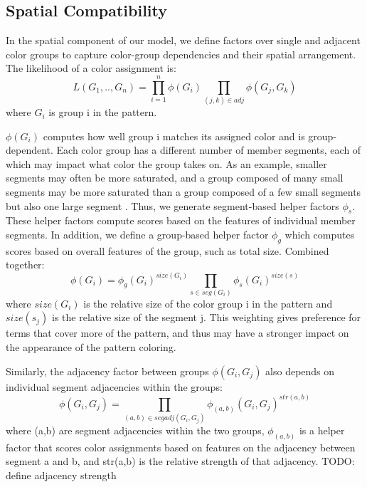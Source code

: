 \subsection{Spatial Compatibility}
\label{sec:spatialCompat}

In the spatial component of our model, we define factors over single and adjacent color groups to capture color-group dependencies and their spatial arrangement. The likelihood of a color assignment is:
\begin{equation}
L(G_1,..,G_n) = \prod_{i=1}^n \phi(G_i) \prod_{(j,k) \in adj} \phi(G_j, G_k)
\end{equation}
where $G_i$ is group i in the pattern.

$\phi(G_i)$ computes how well group i matches its assigned color and is group-dependent. Each color group has a different number of member segments, each of which may impact what color the group takes on. As an example, smaller segments may often be more saturated, and a group composed of many small segments may be more saturated than a group composed of a few small segments but also one large segment . Thus, we generate segment-based helper factors $\phi_s$. These helper factors compute scores based on the features of individual member segments. In addition, we define a group-based helper factor $\phi_g$ which computes scores based on overall features of the group, such as total size. Combined together:
\begin{equation}
\phi(G_i) = \phi_g(G_i)^{size(G_i)} \prod_{s \in seg(G_i)} \phi_{s}(G_i)^{size(s)}
\end{equation}
where $size(G_i)$ is the relative size of the color group i in the pattern and $size({s_j})$ is the relative size of the segment j. This weighting gives preference for terms that cover more of the pattern, and thus may have a stronger impact on the appearance of the pattern coloring.


Similarly, the adjacency factor between groups $\phi(G_i, G_j)$ also depends on individual segment adjacencies within the groups:
\begin{equation}
\phi(G_i, G_j) = \prod_{(a,b) \in segadj(G_i, G_j)}^{} \phi_{(a,b)}(G_i, G_j)^{str(a,b)}
\end{equation}
where (a,b) are segment adjacencies within the two groups, $\phi_{(a,b)}$ is a helper factor that scores color assignments based on features on the adjacency between segment a and b, and str(a,b) is the relative strength of that adjacency.
TODO: define adjacency strength

